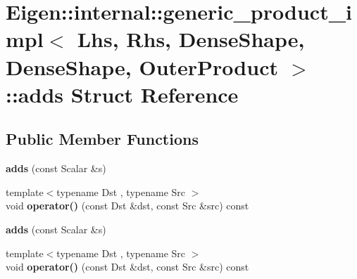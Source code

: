 \hypertarget{struct_eigen_1_1internal_1_1generic__product__impl_3_01_lhs_00_01_rhs_00_01_dense_shape_00_01_de79c82097ad07c840c671e4414c434d06}{}\section{Eigen\+:\+:internal\+:\+:generic\+\_\+product\+\_\+impl$<$ Lhs, Rhs, Dense\+Shape, Dense\+Shape, Outer\+Product $>$\+:\+:adds Struct Reference}
\label{struct_eigen_1_1internal_1_1generic__product__impl_3_01_lhs_00_01_rhs_00_01_dense_shape_00_01_de79c82097ad07c840c671e4414c434d06}
\subsection*{Public Member Functions}
\begin{DoxyCompactItemize}
\item 
\mbox{\label{struct_eigen_1_1internal_1_1generic__product__impl_3_01_lhs_00_01_rhs_00_01_dense_shape_00_01_de79c82097ad07c840c671e4414c434d06_ab8ee626a841d7b6b4c9c96d9f1095ad0}} 
{\bfseries adds} (const Scalar \&s)
\item 
\mbox{\label{struct_eigen_1_1internal_1_1generic__product__impl_3_01_lhs_00_01_rhs_00_01_dense_shape_00_01_de79c82097ad07c840c671e4414c434d06_afea46f2f8317b6f79c31b9244b1ece68}} 
{\footnotesize template$<$typename Dst , typename Src $>$ }\\void {\bfseries operator()} (const Dst \&dst, const Src \&src) const
\item 
\mbox{\label{struct_eigen_1_1internal_1_1generic__product__impl_3_01_lhs_00_01_rhs_00_01_dense_shape_00_01_de79c82097ad07c840c671e4414c434d06_ab8ee626a841d7b6b4c9c96d9f1095ad0}} 
{\bfseries adds} (const Scalar \&s)
\item 
\mbox{\label{struct_eigen_1_1internal_1_1generic__product__impl_3_01_lhs_00_01_rhs_00_01_dense_shape_00_01_de79c82097ad07c840c671e4414c434d06_afea46f2f8317b6f79c31b9244b1ece68}} 
{\footnotesize template$<$typename Dst , typename Src $>$ }\\void {\bfseries operator()} (const Dst \&dst, const Src \&src) const
\end{DoxyCompactItemize}
